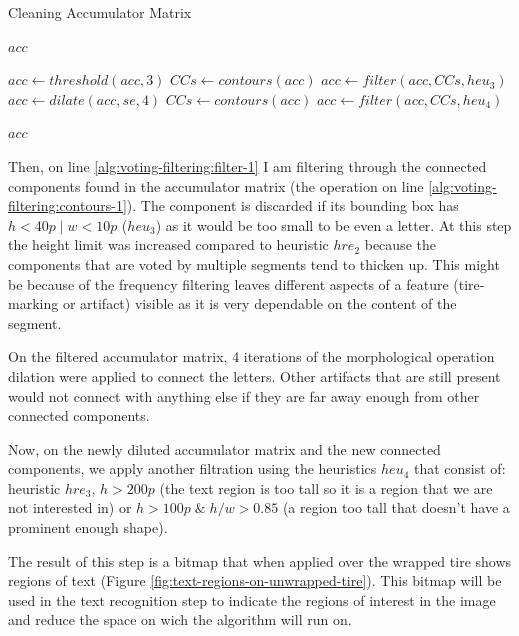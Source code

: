 \begin{algorithm}
    \caption{Cleaning Accumulator Matrix}\label{alg:voting-filtering}
    \begin{algorithmic}[1]
        \Require $acc$

        \State $acc \gets threshold(acc, 3)$
        \State $CCs \gets contours(acc)$\label{alg:voting-filtering:contours-1}
        \State $acc \gets filter(acc, CCs, heu_3)$\label{alg:voting-filtering:filter-1}
        \State $acc \gets dilate(acc, se, 4)$
        \State $CCs \gets contours(acc)$
        \State $acc \gets filter(acc, CCs, heu_4)$

        \State \Return $acc$
    \end{algorithmic}
\end{algorithm}

Then, on line \ref{alg:voting-filtering:filter-1} I am filtering through the connected components found in the accumulator matrix (the operation on line \ref{alg:voting-filtering:contours-1}). The component is discarded if its bounding box has $h < 40p \;|\; w < 10p$ ($heu_3$\label{filtering:heuristics-3}) as it would be too small to be even a letter. At this step the height limit was increased compared to heuristic \hyperref[filtering:heuristics-2]{$hre_2$} because the components that are voted by multiple segments tend to thicken up. This might be because of the frequency filtering leaves different aspects of a feature (tire-marking or artifact) visible as it is very dependable on the content of the segment.

On the filtered accumulator matrix, 4 iterations of the morphological operation dilation were applied to connect the letters. Other artifacts that are still present would not connect with anything else if they are far away enough from other connected components.

Now, on the newly diluted accumulator matrix and the new connected components, we apply another filtration using the heuristics $heu_4$\label{filtering:heuristics-4} that consist of: heuristic \hyperref[filtering:heuristics-3]{$hre_3$}, $h > 200p$ (the text region is too tall so it is a region that we are not interested in) or $h > 100p \;\&\; h/w > 0.85$ (a region too tall that doesn't have a prominent enough shape).

The result of this step is a bitmap that when applied over the wrapped tire shows regions of text (Figure \ref{fig:text-regions-on-unwrapped-tire}). This bitmap will be used in the text recognition step to indicate the regions of interest in the image and reduce the space on wich the algorithm will run on.

